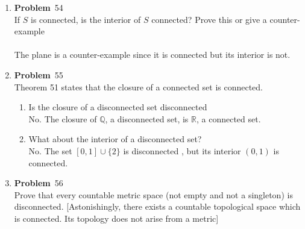 \documentclass[12pt]{amsart}
\newcommand{\benu}{\begin{enumerate}}
\newcommand{\eenu}{\end{enumerate}}
\theoremstyle{definition}
\newcommand{\mbR}{\mathbb{R}}
\newcommand{\mbQ}{\mathbb{Q}}
\newcommand{\itep}{\item {\bfseries Problem}\ }
\begin{document}
\begin{enumerate}[series=p]
\newpage
\itep 54\\
If $S$ is connected, is the interior of $S$ connected?  Prove this or give a counter-example
\\\\
The plane is a counter-example since it is connected but its interior is not.
\newpage

\itep 55\\
Theorem 51 states that the closure of a connected set is connected.
	\benu
		\item Is the closure of a disconnected set disconnected\\
		No.  The closure of $\mbQ$, a disconnected set, is $\mbR$, a connected set.
		\item What about the interior of a disconnected set?\\
		No.  The set $[0,1] \cup \{2\}$ is disconnected , but its interior $(0,1)$ is connected.
	\eenu
\newpage

\itep 56\\
Prove that every countable metric space (not empty and not a singleton) is disconnected.  [Astonishingly, there exists a countable topological space which is connected.  Its topology does not arise from a metric]


\end{enumerate}
\end{document}
